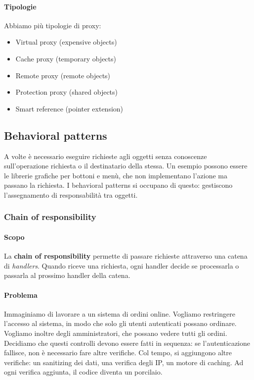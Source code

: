 \documentclass[11pt]{article}
\begin{document}
\paragraph{Tipologie}
Abbiamo più tipologie di proxy:
\begin{itemize}
    \item Virtual proxy (expensive objects) 
    \item Cache proxy (temporary objects) 
    \item Remote proxy (remote objects)
    \item Protection proxy (shared objects)
    \item Smart reference (pointer extension)
\end{itemize}
\subsection{Behavioral patterns}
A volte è necessario eseguire richieste agli oggetti senza conoscenze sull'operazione richiesta o il destinatario della stessa. Un esempio possono essere le librerie grafiche per bottoni e menù, che non implementano l'azione ma passano la richiesta. I behavioral patterns si occupano di questo: gestiscono l'assegnamento di responsabilità tra oggetti.
\subsubsection{Chain of responsibility}
\paragraph{Scopo}
La \textbf{chain of responsibility} permette di passare richieste attraverso una catena di \textit{handlers}. Quando riceve una richiesta, ogni handler decide se processarla o passarla al prossimo handler della catena.
\paragraph{Problema}
Immaginiamo di lavorare a un sistema di ordini online. Vogliamo restringere l'accesso al sistema, in modo che solo gli utenti autenticati possano ordinare. Vogliamo inoltre degli amministratori, che possano vedere tutti gli ordini. Decidiamo che questi controlli devono essere fatti in sequenza: se l'autenticazione fallisce, non è necessario fare altre verifiche. Col tempo, si aggiungono altre verifiche: un sanitizing dei dati, una verifica degli IP, un motore di caching. Ad ogni verifica aggiunta, il codice diventa un porcilaio.
\end{document}
